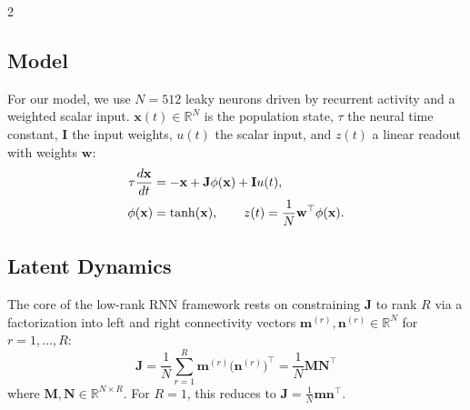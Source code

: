 \documentclass[10pt]{article}
\begin{document}
\begin{multicols}{2}
\subsection{Model}

For our model, we use $N = 512$ leaky neurons driven by recurrent activity and a weighted scalar input. $\mathbf{x}(t)\in\mathbb{R}^N$ is the population state, $\tau$ the neural time constant, $\mathbf{I}$ the input weights, $u(t)$ the scalar input, and $z(t)$ a linear readout with weights $\mathbf{w}$:
\begin{align}
\tau\frac{d\mathbf{x}}{dt}
&=-\mathbf{x}+\mathbf{J}\phi(\mathbf{x})+\mathbf{I}u(t), \notag\\
\phi(\mathbf{x})&=\tanh(\mathbf{x}), \qquad
z(t)=\frac{1}{N}\mathbf{w}^{\top}\phi(\mathbf{x}).
\end{align}

\subsection{Latent Dynamics}

The core of the low-rank RNN framework rests on constraining $\mathbf{J}$ to rank $R$ via a factorization into left and right connectivity vectors $\mathbf{m}^{(r)},\mathbf{n}^{(r)}\in\mathbb{R}^N$ for $r=1,\ldots,R$:
\begin{equation}
\mathbf{J}
=\frac{1}{N}\sum_{r=1}^{R}\mathbf{m}^{(r)}\bigl(\mathbf{n}^{(r)}\bigr)^{\top}
=\frac{1}{N}\mathbf{M}\mathbf{N}^{\top}
\end{equation}
where $\mathbf{M},\mathbf{N}\in\mathbb{R}^{N\times R}$. For $R=1$, this reduces to $\mathbf{J}=\frac{1}{N}\mathbf{m}\mathbf{n}^{\top}$.


\end{multicols}
\end{document}
